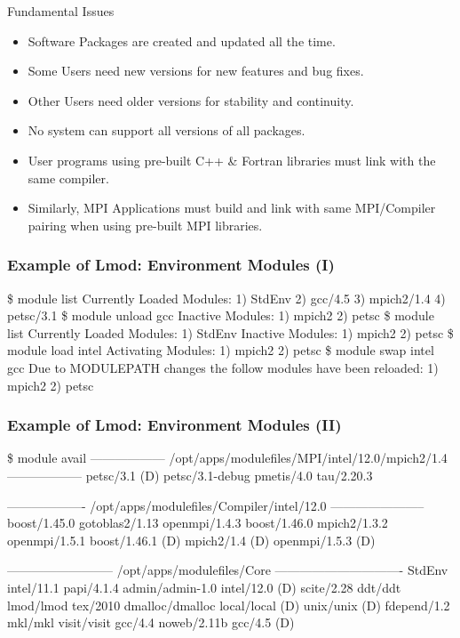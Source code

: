 \documentclass{beamer}
\begin{document}
\begin{frame}{Fundamental Issues}
  \begin{itemize}
    \item Software Packages are created and updated all the time.
    \item Some Users need new versions for new features and bug fixes.
    \item Other Users need older versions for stability and continuity.
    \item No system can support all versions of all packages.
    \item User programs using pre-built C++ \& Fortran libraries must link with the same compiler.
    \item Similarly, MPI Applications must build and link with same
      MPI/Compiler pairing when using pre-built MPI libraries.
  \end{itemize}
\end{frame}


\begin{frame}[fragile]
    \frametitle{Example of Lmod: Environment Modules (I)}
    {\tiny
\begin{semiverbatim}
{\color{blue}\$ module list}
Currently Loaded Modules:
  1) StdEnv  2) gcc/4.5  3) mpich2/1.4  4) petsc/3.1
{\color{blue}\$ module unload gcc}
Inactive Modules:
  1) mpich2  2) petsc
{\color{blue}\$ module list}
Currently Loaded Modules:
  1) StdEnv
Inactive Modules:
  1) mpich2  2) petsc
{\color{blue}\$ module load intel}
Activating Modules:
  1) mpich2  2) petsc
{\color{blue}\$ module swap intel gcc}
Due to MODULEPATH changes the follow modules have been reloaded:
  1) mpich2  2) petsc
\end{semiverbatim}
    }
\end{frame}

\begin{frame}[fragile]
    \frametitle{Example of Lmod: Environment Modules (II)}
    {\tiny
\begin{semiverbatim}
\$ {\color{blue} module avail}
------------------ /opt/apps/modulefiles/MPI/intel/12.0/mpich2/1.4 ------------------
  petsc/3.1 (D)    petsc/3.1-debug    pmetis/4.0    tau/2.20.3

------------------- /opt/apps/modulefiles/Compiler/intel/12.0 -----------------------
  boost/1.45.0        gotoblas2/1.13      openmpi/1.4.3
  boost/1.46.0        mpich2/1.3.2        openmpi/1.5.1
  boost/1.46.1 (D)    mpich2/1.4    (D)   openmpi/1.5.3   (D)

-------------------------- /opt/apps/modulefiles/Core -------------------------------
  StdEnv               intel/11.1         papi/4.1.4
  admin/admin-1.0      intel/12.0  (D)    scite/2.28
  ddt/ddt              lmod/lmod          tex/2010
  dmalloc/dmalloc      local/local (D)    unix/unix    (D)
  fdepend/1.2          mkl/mkl            visit/visit
  gcc/4.4              noweb/2.11b
  gcc/4.5        (D)
\end{semiverbatim}
    }
\end{frame}
\end{document}
